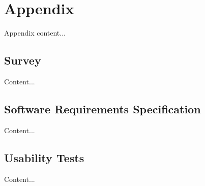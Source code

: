 %
%
\chapter*{Appendix}

Appendix content...

\section*{Survey}

Content...

\section*{Software Requirements Specification}
\label{appendix:a}

Content...

\section*{Usability Tests}
\label{appendix:usability_tests}

Content...
